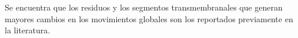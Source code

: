 Se encuentra que los residuos y los segmentos transmembranales que generan mayores cambios en los movimientos globales son los reportados previamente en la literatura.\\
